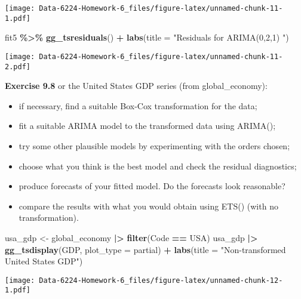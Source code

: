 \documentclass[
]{article}
\newenvironment{Shaded}{\begin{snugshade}}{\end{snugshade}}
\newcommand{\AttributeTok}[1]{\textcolor[rgb]{0.13,0.29,0.53}{#1}}
\newcommand{\FunctionTok}[1]{\textcolor[rgb]{0.13,0.29,0.53}{\textbf{#1}}}
\newcommand{\NormalTok}[1]{#1}
\newcommand{\OtherTok}[1]{\textcolor[rgb]{0.56,0.35,0.01}{#1}}
\newcommand{\SpecialCharTok}[1]{\textcolor[rgb]{0.81,0.36,0.00}{\textbf{#1}}}
\newcommand{\StringTok}[1]{\textcolor[rgb]{0.31,0.60,0.02}{#1}}
\providecommand{\tightlist}{%
  \setlength{\itemsep}{0pt}\setlength{\parskip}{0pt}}
\begin{document}
\texttt{[image: Data-6224-Homework-6\_files/figure-latex/unnamed-chunk-11-1.pdf]}

\begin{Shaded}
\begin{Highlighting}[]
\NormalTok{fit5 }\SpecialCharTok{\%\textgreater{}\%} 
  \FunctionTok{gg\_tsresiduals}\NormalTok{() }\SpecialCharTok{+}
  \FunctionTok{labs}\NormalTok{(}\AttributeTok{title =} \StringTok{"Residuals for ARIMA(0,2,1) "}\NormalTok{)}
\end{Highlighting}
\end{Shaded}

\texttt{[image: Data-6224-Homework-6\_files/figure-latex/unnamed-chunk-11-2.pdf]}

\textbf{Exercise 9.8} or the United States GDP series (from
global\_economy):

\begin{itemize}
\tightlist
\item
  if necessary, find a suitable Box-Cox transformation for the data;
\item
  fit a suitable ARIMA model to the transformed data using ARIMA();
\item
  try some other plausible models by experimenting with the orders
  chosen;
\item
  choose what you think is the best model and check the residual
  diagnostics;
\item
  produce forecasts of your fitted model. Do the forecasts look
  reasonable?
\item
  compare the results with what you would obtain using ETS() (with no
  transformation).
\end{itemize}

\begin{Shaded}
\begin{Highlighting}[]
\NormalTok{usa\_gdp }\OtherTok{\textless{}{-}}\NormalTok{ global\_economy }\SpecialCharTok{|\textgreater{}} \FunctionTok{filter}\NormalTok{(Code }\SpecialCharTok{==} \StringTok{\textquotesingle{}USA\textquotesingle{}}\NormalTok{)}
\NormalTok{usa\_gdp }\SpecialCharTok{|\textgreater{}} \FunctionTok{gg\_tsdisplay}\NormalTok{(GDP, }\AttributeTok{plot\_type =} \StringTok{\textquotesingle{}partial\textquotesingle{}}\NormalTok{) }\SpecialCharTok{+} \FunctionTok{labs}\NormalTok{(}\AttributeTok{title =} \StringTok{"Non{-}transformed United States GDP"}\NormalTok{)}
\end{Highlighting}
\end{Shaded}

\texttt{[image: Data-6224-Homework-6\_files/figure-latex/unnamed-chunk-12-1.pdf]}
\end{document}
